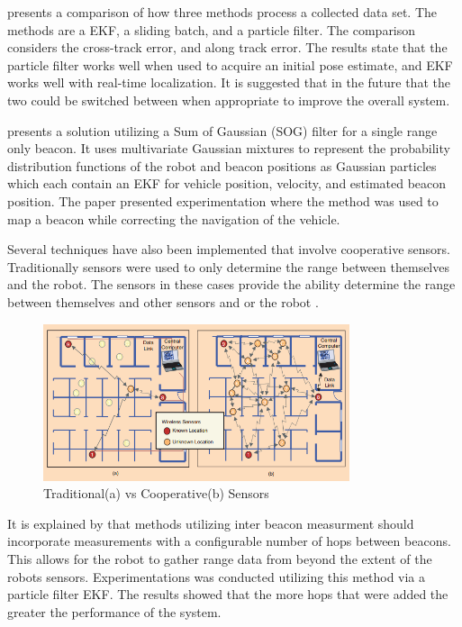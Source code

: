 \documentclass[conference]{IEEEtran}
\begin{document}
\cite{Kurth2003} presents a comparison of how three methods process a collected data set. The methods are a EKF, a sliding batch, and a particle filter. The comparison considers the cross-track error, and along track error. The results state that the particle filter works well when used to acquire an initial pose estimate, and EKF works well with real-time localization. It is suggested that in the future that the two could be switched between when appropriate to improve the overall system. 




\cite{Vallicrosa2015} presents a solution utilizing a Sum of Gaussian (SOG) filter for a single range only beacon. It uses multivariate Gaussian mixtures to represent the probability distribution functions of the robot and beacon positions as Gaussian particles which each contain an EKF for vehicle position, velocity, and estimated beacon position. The paper presented experimentation where the method was used to map a beacon while correcting the navigation of the vehicle. 

Several techniques have also been implemented that involve cooperative sensors. Traditionally sensors were used to only determine the range between themselves and the robot. The sensors in these cases provide the ability determine the range between themselves and other sensors and or the robot \cite{Patwari2005}.
\begin{figure}[h!]
	\centering
	\includegraphics[width=90mm]{coop_loc_comp_patwari.png}
	\caption{Traditional(a) vs Cooperative(b) Sensors \cite{Patwari2005}}
	\label{trad_vs_coop_sensors}
\end{figure}
\FloatBarrier

It is explained by \cite{Torres-Gonzalez2015} that methods utilizing inter beacon measurment should incorporate measurements with a configurable number of hops between beacons. This allows for the robot to gather range data from beyond the extent of the robots sensors. Experimentations was conducted utilizing this method via a particle filter EKF. The results showed that the more hops that were added the greater the performance of the system. 
\end{document}

